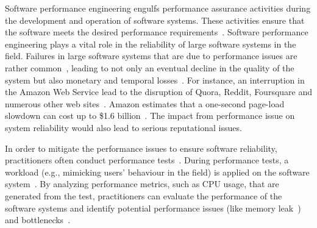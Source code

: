 Software performance engineering engulfs performance assurance activities during the development and operation of software systems. These activities ensure that the software meets the desired performance requirements~\cite{futureofspe}. Software performance engineering plays a vital role in the reliability of large software systems in the field. Failures in large software systems that are due to performance issues are rather common~\cite{tailatscale, foo2010mining}, leading to not only an eventual decline in the quality of the system but also monetary and temporal losses~\cite{costofdowntime}. For instance, an interruption in the Amazon Web Service lead to the disruption of Quora, Reddit, Foursquare and numerous other web sites~\cite{amazondown}. Amazon estimates that a one-second page-load slowdown can cost up to \$1.6 billion~\cite{amazononesec}. The impact from performance issue on system reliability would also lead to serious reputational issues.


In order to mitigate the performance issues to ensure software reliability, practitioners often conduct performance tests~\cite{futureofspe}. During performance tests, a workload (e.g., mimicking users' behaviour in the field) is applied on the software system~\cite{ranjanbook,Syer2016}. By analyzing performance metrics, such as CPU usage, that are generated from the test, practitioners can evaluate the performance of the software systems and identify potential performance issues (like memory leak~\cite{markicsm2013}) and bottlenecks~\cite{5635038}.



